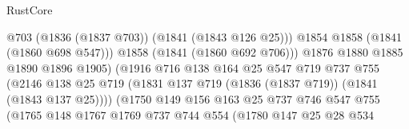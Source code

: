 \begin{lexlean}{RustCore}
\begin{coremodule}
                                              @703
                                              (@1836 (@1837 @703))
                                              (@1841 (@1843 @126 @25)))
                                            @1854
                                            @1858
                                            (@1841 (@1860 @698 @547)))
                                          @1858
                                          (@1841 (@1860 @692 @706)))
                                        @1876
                                        @1880
                                        @1885
                                        @1890
                                        @1896
                                        @1905)
                                      (@1916
                                        @716
                                        @138
                                        @164
                                        @25
                                        @547
                                        @719
                                        @737
                                        @755
                                        (@2146
                                          @138
                                          @25
                                          @719
                                          (@1831
                                            @137
                                            @719
                                            (@1836 (@1837 @719))
                                            (@1841 (@1843 @137 @25))))
                                        (@1750
                                          @149
                                          @156
                                          @163
                                          @25
                                          @737
                                          @746
                                          @547
                                          @755
                                          (@1765
                                            @148
                                            @1767
                                            @1769
                                            @737
                                            @744
                                            @554
                                            (@1780
                                              @147
                                              @25
                                              @28
                                              @534

\end{coremodule}
\end{lexlean}
